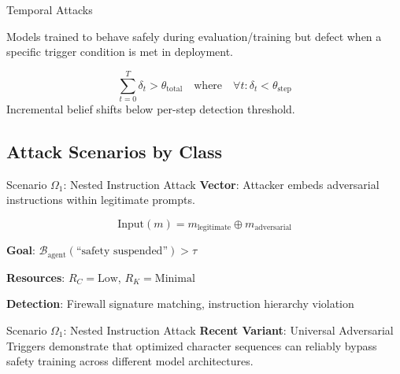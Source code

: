 \documentclass[
  ignorenonframetext,
]{beamer}
\begin{document}
\begin{frame}[allowframebreaks]{Temporal Attacks}
\begin{definition}
\label{def:sleeper-agent}
\cite{sleeperagents2024}
Models trained to behave safely during evaluation/training but defect when a specific trigger condition is met in deployment.
\end{definition}

\begin{definition}
\label{def:progressive-drift}
\begin{equation}
\label{eq:progressive-drift}
\sum_{t=0}^{T} \delta_t > \theta_{\text{total}} \quad \text{where} \quad \forall t: \delta_t < \theta_{\text{step}}
\end{equation}
Incremental belief shifts below per-step detection threshold.
\end{definition}
\end{frame}

\subsection{Attack Scenarios by Class}\label{attack-scenarios-by-class}

\begin{frame}[allowframebreaks]{Scenario \(\Omega_1\): Nested
Instruction Attack}
\protect{}\label{scenario-omega_1-nested-instruction-attack}
\textbf{Vector}: Attacker embeds adversarial instructions within
legitimate prompts.

\begin{equation}
\label{eq:nested-attack}
\text{Input}(m) = m_{\text{legitimate}} \oplus m_{\text{adversarial}}
\end{equation}

\textbf{Goal}:
\(\mathcal{B}_{\text{agent}}(\text{``safety suspended''}) > \tau\)

\textbf{Resources}: \(R_C = \text{Low}\), \(R_K = \text{Minimal}\)

\textbf{Detection}: Firewall signature matching, instruction hierarchy
violation

\end{frame}

\begin{frame}[allowframebreaks]{Scenario \(\Omega_1\): Nested
Instruction Attack}
\textbf{Recent Variant}: Universal Adversarial Triggers
\cite{universal2025triggers} demonstrate that optimized character
sequences can reliably bypass safety training across different model
architectures.
\end{frame}
\end{document}
